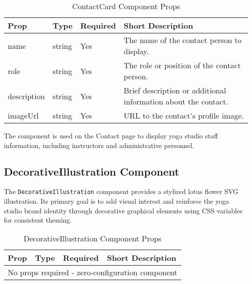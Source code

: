 \begin{table}[H]
    \centering
    \setlength{\tabcolsep}{5pt}
    \renewcommand{\arraystretch}{1.2}
    \begin{tabular}{|p{2.2cm}|p{3.6cm}|p{1.5cm}|p{6cm}|}
        \hline
        \rowcolor{bluepoli!20}
        \textbf{Prop} & \textbf{Type} & \textbf{Required} & \textbf{Short Description} \\
        \hline
        name & string & Yes & The name of the contact person to display. \\
        \hline
        role & string & Yes & The role or position of the contact person. \\
        \hline
        description & string & Yes & Brief description or additional information about the contact. \\
        \hline
        imageUrl & string & Yes & URL to the contact's profile image. \\
        \hline
    \end{tabular}
    \caption{ContactCard Component Props}
\end{table}

The component is used on the Contact page to display yoga studio staff information, including instructors and administrative personnel.

\subsection{DecorativeIllustration Component}
The \texttt{DecorativeIllustration} component provides a stylized lotus flower SVG illustration. Its primary goal is to add visual interest and reinforce the yoga studio brand identity through decorative graphical elements using CSS variables for consistent theming.

\begin{table}[H]
    \centering
    \setlength{\tabcolsep}{5pt}
    \renewcommand{\arraystretch}{1.2}
    \begin{tabular}{|p{2.2cm}|p{3.6cm}|p{1.5cm}|p{6cm}|}
        \hline
        \rowcolor{bluepoli!20}
        \textbf{Prop} & \textbf{Type} & \textbf{Required} & \textbf{Short Description} \\
        \hline
        \multicolumn{4}{|c|}{No props required - zero-configuration component} \\
        \hline
    \end{tabular}
    \caption{DecorativeIllustration Component Props}
\end{table}

